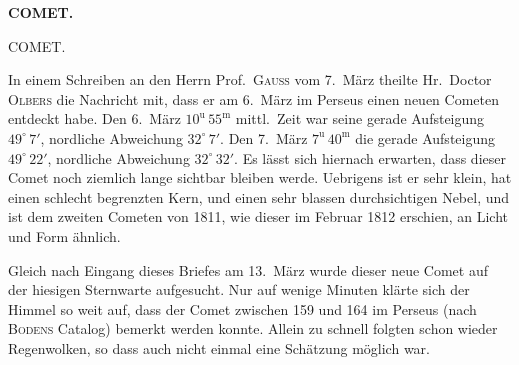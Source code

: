 \clearpage
\thispagestyle{empty}
\noindent{}%
%
\parbox[t]{\dimexpr\linewidth-24mm\relax}{\centering\footnotesize\bfseries COMET.\par}%
\makebox[12mm][r]{}\par\nobreak\medskip
\begin{center}
\large COMET.
\end{center}

\par\indent In einem Schreiben an den Herrn Prof.\ \textsc{Gauss} vom 7.\ März theilte Hr.\ Doctor \textsc{Olbers} die Nachricht mit, dass er am 6.\ März im Perseus einen neuen Cometen entdeckt habe. Den 6.\ März $10^{\mathrm u}\,55^{\mathrm m}$ mittl.\ Zeit war seine gerade Aufsteigung $49^\circ\,7'$, nordliche Abweichung $32^\circ\,7'$. Den 7.\ März $7^{\mathrm u}\,40^{\mathrm m}$ die gerade Aufsteigung $49^\circ\,22'$, nordliche Abweichung $32^\circ\,32'$. Es lässt sich hiernach erwarten, dass dieser Comet noch ziemlich lange sichtbar bleiben werde. Uebrigens ist er sehr klein, hat einen schlecht begrenzten Kern, und einen sehr blassen durchsichtigen Nebel, und ist dem zweiten Cometen von 1811, wie dieser im Februar 1812 erschien, an Licht und Form ähnlich.

\par\indent Gleich nach Eingang dieses Briefes am 13.\ März wurde dieser neue Comet auf der hiesigen Sternwarte aufgesucht. Nur auf wenige Minuten klärte sich der Himmel so weit auf, dass der Comet zwischen 159 und 164 im Perseus (nach \textsc{Bodens} Catalog) bemerkt werden konnte. Allein zu schnell folgten schon wieder Regenwolken, so dass auch nicht einmal eine Schätzung möglich war.

